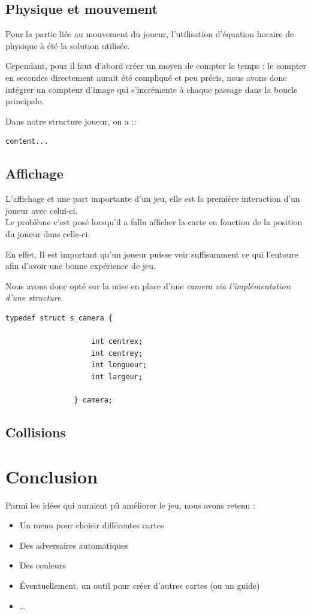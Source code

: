 \documentclass[12pt]{article}
\begin{document}
	
		\subsection{Physique et mouvement}
		
		Pour la partie liée au mouvement du joueur, l'utilisation d'équation horaire de physique à été la solution utilisée.
		
		Cependant, pour il faut d'abord créer un moyen de compter le temps : le compter en secondes directement aurait été compliqué et peu précis, nous avons donc intégrer un compteur d'image qui s'incrémente à chaque passage dans la boucle principale.
		
		\medskip
		
		Dans notre structure joueur, on a ::
		
		\begin{lstlisting}[]
			content...
		\end{lstlisting}
		
		\newpage
		
		\subsection{Affichage}
		
			L'affichage et une part importante d'un jeu, elle est la première interaction d'un joueur avec celui-ci.\\


			Le problème c'est posé lorsqu'il a fallu afficher la carte en fonction de la position du joueur dans celle-ci.

			En effet, Il est important qu'un joueur puisse voir suffisamment ce qui l'entoure afin d'avoir une bonne expérience de jeu.

			Nous avons donc opté sur la mise en place d'une \itshape{camera} via l'implémentation d'une structure.
			\begin{lstlisting}[title={Structure Camera}]
				typedef struct s_camera {
				
					int centrex;
					int centrey;
					int longueur;
					int largeur;
				
				} camera;
			\end{lstlisting}

		\subsection{Collisions}
		
		
		

	\section{Conclusion}

	Parmi les idées qui auraient pû améliorer le jeu, nous avons retenu :
	\begin{itemize}
		\item Un menu pour choisir différentes cartes
		\item Des adversaires automatiques
		\item Des couleurs
		\item Éventuellement, un outil pour créer d'autres cartes (ou un guide)
		\item \dots
	\end{itemize}
		
\end{document}
